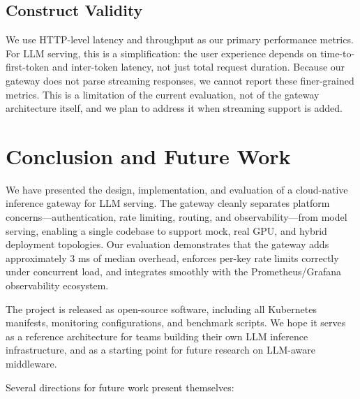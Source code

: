 \documentclass[10pt,journal]{IEEEtran}
\begin{document}
\subsection{Construct Validity}

We use HTTP-level latency and throughput as our primary performance metrics. For LLM serving, this is a simplification: the user experience depends on time-to-first-token and inter-token latency, not just total request duration. Because our gateway does not parse streaming responses, we cannot report these finer-grained metrics. This is a limitation of the current evaluation, not of the gateway architecture itself, and we plan to address it when streaming support is added.

\section{Conclusion and Future Work}\label{sec:conclusion}

We have presented the design, implementation, and evaluation of a cloud-native inference gateway for LLM serving. The gateway cleanly separates platform concerns---authentication, rate limiting, routing, and observability---from model serving, enabling a single codebase to support mock, real GPU, and hybrid deployment topologies. Our evaluation demonstrates that the gateway adds approximately 3 ms of median overhead, enforces per-key rate limits correctly under concurrent load, and integrates smoothly with the Prometheus/Grafana observability ecosystem.

The project is released as open-source software, including all Kubernetes manifests, monitoring configurations, and benchmark scripts. We hope it serves as a reference architecture for teams building their own LLM inference infrastructure, and as a starting point for future research on LLM-aware middleware.

Several directions for future work present themselves:
\end{document}
